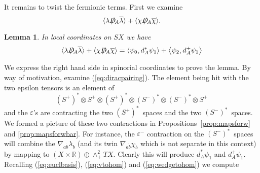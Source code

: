 \documentclass[twoside]{amsart}
\newcommand{\RR}{\ensuremath{\mathbb{R}}}
\newtheorem{lemma}{Lemma}
\renewcommand{\eqref}[1]{(\ref{eq:#1})}
\renewcommand{\epsilon}{\varepsilon}
\newcommand{\enm}[1]{\ensuremath{#1}}
\newcommand{\diraci}[1]{\enm{{#1}\hskip-.65em /}}
\newcommand{\odiraca}{\diraci{D}}
\newcommand{\ip}[2]{\enm{\left<#1,#2\right>}}
\renewcommand{\bar}[1]{\overline{#1}}
\newcommand{\spl}{\enm{S^{+}}}
\newcommand{\sm}{\enm{S^{-}}}
\newcommand{\spd}{\enm{(\spl)^{*}}}
\newcommand{\smd}{\enm{(\sm)^{*}}}
\renewcommand{\epsilon}{\varepsilon}
\begin{document}
It remains to twist the fermionic terms.  First we examine
\[ \langle{\lambda}\odiraca_{A}\bar{\lambda}\rangle
    + \langle{\chi}\odiraca_{A}\bar{\chi}\rangle. \]
\begin{lemma}
    In local coordinates on \( SX \) we have
    \begin{equation}
        \label{diractoforms}
        \langle{\lambda}\odiraca_{A}\bar{\lambda}\rangle
        + \langle{\chi}\odiraca_{A}\bar{\chi}\rangle
        = \ip{\psi_{0}}{d_{A}^{*}\psi_{1}}
        + \ip{\psi_{2}}{d_{A}^{+}\psi_{1}}
    \end{equation}
\end{lemma}
\proof We express the right hand side in spinorial coordinates to
prove the lemma.  By way of motivation, examine \eqref{diracpairing}.
The element being hit with the two epsilon tensors is an element of \[
\spd\otimes\spl\otimes \spd\otimes\smd\otimes\smd\otimes \spl \] and
the \( \epsilon \)'s are contracting the two \spd\ spaces and the two
\smd\ spaces.  We formed a picture of these two contractions in
Propositions~\ref{prop:mapsforw} and \ref{prop:mapsforwbar}.  For
instance, the \( \epsilon^{-} \) contraction on the \smd\ spaces will
combine the \( \nabla_{a\dot{b}}\lambda_{\dot{b}} \) (and its twin \(
\nabla_{a\dot{b}}\chi_{\dot{b}} \) which is not separate in this
context) by mapping to \( (X\times\RR)\oplus\wedge^{2}_{+}TX. \)
Clearly this will produce \( d_{A}^{*}\psi_{1} \) and \(
d_{A}^{+}\psi_{1} \).  Recalling \eqref{euclbasis}, \eqref{vtohom} and
\eqref{wedgetohom} we compute
\end{document}
